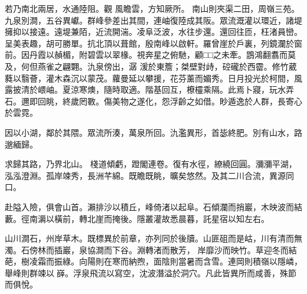 \begin{pinyinscope}
若乃南北兩居，水通陸阻。觀
 風瞻雲，方知厥所。
 南山則夾渠二田，周嶺三苑。九泉別澗，五谷異巘。群峰參差出其間，連岫復陸成其阪。眾流溉灌以環近，諸堤擁抑以接遠。遠堤兼陌，近流開湍。凌阜泛波，水往步還。還回往匝，枉渚員巒。呈美表趣，胡可勝單。抗北頂以葺館，殷南峰以啟軒。羅曾崖於戶裏，列鏡瀾於窗前。因丹霞以赬楣，附碧雲以翠椽。視奔星之俯馳，顧□□之未牽。鵾鴻翻翥而莫及，何但燕雀之翩翾。氿泉傍出，潺
 湲於東簷；桀壁對歭，硿礲於西霤。修竹葳蕤以翳薈，灌木森沉以蒙茂。蘿曼延以攀援，花芬薰而媚秀。日月投光於柯間，風露披清於㟪岫。夏涼寒燠，隨時取適。階基回互，橑欞乘隔。此焉卜寢，玩水弄石。邇即回眺，終歲罔斁。傷美物之遂化，怨浮齡之如借。眇遁逸於人群，長寄心於雲霓。


因以小湖，鄰於其隈。眾流所湊，萬泉所回。氿濫異形，首毖終肥。別有山水，路邈緬歸。



 求歸其路，乃界北山。
 棧道傾虧，蹬閣連卷。復有水徑，繚繞回圓。瀰瀰平湖，泓泓澄淵。孤岸竦秀，長洲芊綿。既瞻既眺，曠矣悠然。及其二川合流，異源同口。


赴隘入險，俱會山首。瀨排沙以積丘，峰倚渚以起阜。石傾瀾而捎巖，木映波而結藪。徑南漘以橫前，轉北崖而掩後。隱叢灌故悉晨暮，託星宿以知左右。


山川澗石，州岸草木。既標異於前章，亦列同於後牘。山匪砠而是岵，川有清而無濁。石傍林而插巖，泉協澗而下谷。淵轉渚而散芳，
 岸靡沙而映竹。草迎冬而結葩，樹凌霜而振綠。向陽則在寒而納煦，面陰則當暑而含雪。連岡則積嶺以隱嶙，舉峰則群竦以𡽱嶭。浮泉飛流以寫空，沈波潛溢於洞穴。凡此皆異所而咸善，殊節而俱悅。



\end{pinyinscope}
